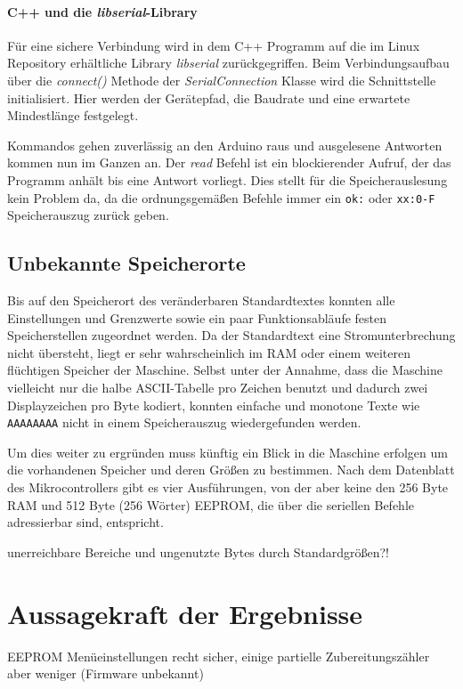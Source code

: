\paragraph{C++ und die \textit{libserial}-Library}
Für eine sichere Verbindung wird in dem C++ Programm auf die im Linux Repository erhältliche Library \textit{libserial} zurückgegriffen.
Beim Verbindungsaufbau über die \textit{connect()} Methode der \textit{SerialConnection} Klasse wird die Schnittstelle initialisiert.
Hier werden der Gerätepfad, die Baudrate und eine erwartete Mindestlänge festgelegt.

Kommandos gehen zuverlässig an den Arduino raus und ausgelesene Antworten kommen nun im Ganzen an.
Der \textit{read} Befehl ist ein blockierender Aufruf, der das Programm anhält bis eine Antwort vorliegt.
Dies stellt für die Speicherauslesung kein Problem da, da die ordnungsgemäßen Befehle immer ein \texttt{ok:} oder \texttt{xx:0-F} Speicherauszug zurück geben.

\subsection{Unbekannte Speicherorte}\label{subsec:UnbekannteSpeicherorte}
Bis auf den Speicherort des veränderbaren Standardtextes konnten alle Einstellungen und Grenzwerte sowie ein paar Funktionsabläufe festen Speicherstellen zugeordnet werden.
Da der Standardtext eine Stromunterbrechung nicht übersteht, liegt er sehr wahrscheinlich im \ac{RAM} oder einem weiteren flüchtigen Speicher der Maschine.
Selbst unter der Annahme, dass die Maschine vielleicht nur die halbe \ac{ASCII}-Tabelle pro Zeichen benutzt und dadurch zwei Displayzeichen pro Byte kodiert, konnten einfache und monotone Texte wie \texttt{AAAAAAAA} nicht in einem Speicherauszug wiedergefunden werden.

Um dies weiter zu ergründen muss künftig ein Blick in die Maschine erfolgen um die vorhandenen Speicher und deren Größen zu bestimmen.
Nach dem Datenblatt des Mikrocontrollers \cite{JuraMicrocontroller} gibt es vier Ausführungen, von der aber keine den 256 Byte \ac{RAM} und 512 Byte (256 Wörter) \ac{EEPROM}, die über die seriellen Befehle adressierbar sind, entspricht.

\todo unerreichbare Bereiche und ungenutzte Bytes durch Standardgrößen?!

\section{Aussagekraft der Ergebnisse}\label{sec:AussagekraftDerErgebnisse}
EEPROM Menüeinstellungen recht sicher, einige partielle Zubereitungszähler aber weniger (Firmware unbekannt)

